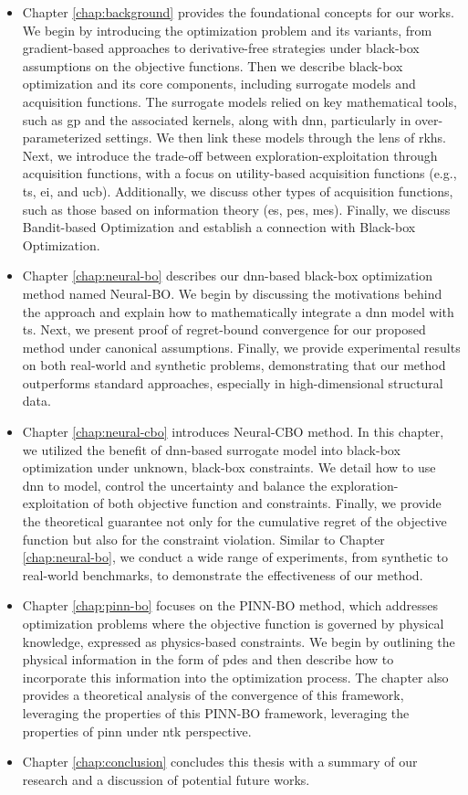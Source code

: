 \begin{itemize}
    \item Chapter \ref{chap:background} provides the foundational concepts for our works. We begin by introducing the optimization problem and its variants,  from gradient-based approaches to derivative-free strategies under black-box assumptions on the objective functions. Then we describe black-box optimization and its core components, including surrogate models and acquisition functions. The surrogate models relied on key mathematical tools, such as \ac{gp} and the associated kernels, along with \ac{dnn}, particularly in over-parameterized settings. We then link these models through the lens of \ac{rkhs}. Next, we introduce the trade-off between exploration-exploitation through acquisition functions, with a focus on utility-based acquisition functions (e.g., \ac{ts}, \ac{ei}, and \ac{ucb}). Additionally, we discuss other types of acquisition functions, such as those based on information theory (\ac{es}, \ac{pes}, \ac{mes}). Finally, we discuss Bandit-based Optimization and establish a connection with Black-box Optimization.  
    \item Chapter \ref{chap:neural-bo} describes our \ac{dnn}-based black-box optimization method named Neural-BO. We begin by discussing the motivations behind the approach and explain how to mathematically integrate a \ac{dnn} model with \acs{ts}. Next, we present proof of regret-bound convergence for our proposed method under canonical assumptions.  Finally, we provide experimental results on both real-world and synthetic problems, demonstrating that our method outperforms standard approaches, especially in high-dimensional structural data.  
    \item Chapter \ref{chap:neural-cbo} introduces Neural-CBO method. In this chapter, we utilized the benefit of \ac{dnn}-based surrogate model into black-box optimization under unknown, black-box constraints. We detail how to use \ac{dnn} to model, control the uncertainty and balance the exploration-exploitation of both objective function and constraints. Finally, we provide the theoretical guarantee not only for the cumulative regret of the objective function but also for the constraint violation. Similar to Chapter \ref{chap:neural-bo}, we conduct a wide range of experiments, from synthetic to real-world benchmarks, to demonstrate the effectiveness of our method.     
    \item Chapter \ref{chap:pinn-bo} focuses on the PINN-BO method, which addresses optimization problems where the objective function is governed by physical knowledge, expressed as physics-based constraints. We begin by outlining the physical information in the form of \acp{pde} and then describe how to incorporate this information into the optimization process. The chapter also provides a theoretical analysis of the convergence of this framework, leveraging the properties of this PINN-BO framework, leveraging the properties of \ac{pinn} under \ac{ntk} perspective.
    \item Chapter \ref{chap:conclusion} concludes this thesis with a summary of our research and a discussion of potential future works.
\end{itemize}
